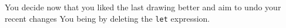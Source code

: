 You decide now that you liked the last drawing better
and aim to undo your recent changes
You being by deleting the \texttt{let} expression.








